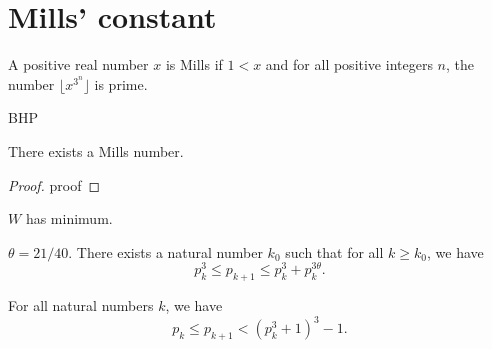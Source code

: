 %

\chapter{Mills' constant}

\begin{definition}
    \label{def:mills}
    A positive real number $x$ is Mills if $1 < x$ and
    for all positive integers $n$, the number $\lfloor x^{3^n} \rfloor$ is prime.
\end{definition}

\begin{theorem}
    \label{thm:BHP}
    BHP
\end{theorem}

\begin{proposition}
    \label{prop:mills}
    There exists a Mills number.
\end{proposition}

\begin{proof}
    proof
\end{proof}

\begin{proposition}
    \label{prop:proposition4}
    $W$ has minimum.
\end{proposition}

\begin{proposition}
    \label{prop:proposition5}
    $\theta = 21/40$.
    There exists a natural number $k_0$ such that for all $k \geq k_0$, we have
    $$
    p_k ^ 3 \leq p_{k+1} \leq p_k ^ 3 + p_k ^ {3\theta}.
    $$
\end{proposition}

\begin{lemma}
    \label{lem:lemma6}
    For all natural numbers $k$, we have
    $$
    p_k \leq p_{k+1} < (p_k ^ 3 + 1) ^ 3 - 1.
    $$
\end{lemma}

